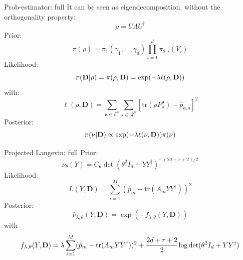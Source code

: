 \documentclass{beamer}
\newcommand{\tr}{\text{tr}}
\newcommand{\mb}{\mathbf}
\newcommand{\tb}{\textbf}
\begin{document}
\begin{frame}{Prob-estimator: full}
    It can be seen as eigendecomposition, without the orthogonality property:
    \begin{equation}
        \rho = U\Lambda U^\dagger
    \end{equation}
    Prior:
    \begin{equation}
        \pi(\rho) = \pi_1(\gamma_1, \dots, \gamma_d) \prod_{i=1}^d \pi_{2, i}(V_i)
    \end{equation}
    Likelihood:
    \begin{equation}
        \pi(\tb D| \rho) = \pi(\rho, \mb D) = \exp(-\lambda \ell(\rho,\mb D))
    \end{equation}
    with:
    \begin{equation}
        \ell(\rho, \mb D) = \sum_{\mb a \in \mathcal{E}^n} \sum_{\mb s \in \mathcal{R}^n} \left[\tr(\rho P^{\mb a}_{\mb s}) - \hat p_{\mb a,\mb s}\right]^2
    \end{equation}
    Posterior:
    \begin{equation}
        \pi(\nu|\tb D) \propto \exp(-\lambda\ell(\nu, \mb D)) \pi(\nu)
    \end{equation}
\end{frame}
\begin{frame}{Projected Langevin: full}
    Prior:
    \begin{equation}
        \nu_{\theta} (Y) = C_\theta \det(\theta^2I_d + YY^\dagger)^{-(2d+r+2)/2}
    \end{equation}
    Likelihood: 
    \begin{equation}
        L(Y, \mb D) = \sum^{M}_{i=1} (\hat p_m - \tr(A_mYY^\dagger))^2
    \end{equation}
    Posterior:
    \begin{equation}
        \hat \nu_{\lambda, \theta}(Y, \mb D) = \exp(-f_{\lambda, \theta}(Y, \mb D))
    \end{equation}
    with \begin{equation}
        f_{\lambda, \theta}(Y, \mb D) = \lambda \sum^{M}_{i=1} (\hat p_m - \tr(A_mYY^\dagger))^2 + \cfrac{2d + r + 2}{2}\log \det(\theta^2I_d + YY^\dagger)
    \end{equation} 
\end{frame}
\end{document}
